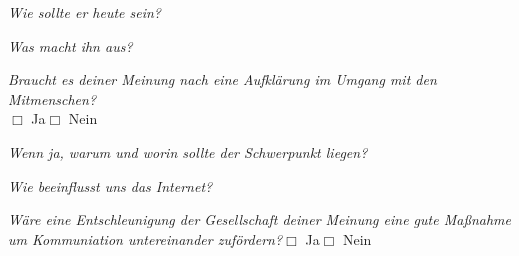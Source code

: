\documentclass[a4paper,12pt]{scrartcl}
\newcommand{\checkbox}{\(\Box\)}
\newcommand{\frage}[1]{\textit{#1}}
\begin{document}
\frage{Wie sollte er heute sein?}
\vspace{2cm}

\frage{Was macht ihn aus?}
\vspace{2cm}

\newpage
\frage{Braucht es deiner Meinung nach eine Aufklärung im Umgang mit den Mitmenschen?}\\
\checkbox{} Ja\hspace{0.8cm}\checkbox{} Nein \par
\frage{Wenn ja, warum und worin sollte der Schwerpunkt liegen?}
\vspace{3cm}

\frage{Wie beeinflusst uns das Internet?}
\vspace{4cm}

\frage{Wäre eine Entschleunigung der Gesellschaft deiner Meinung eine gute Maßnahme um Kommuniation untereinander zufördern?}\hfill\checkbox{} Ja\hspace{0.8cm}\checkbox{} Nein
\end{document}

